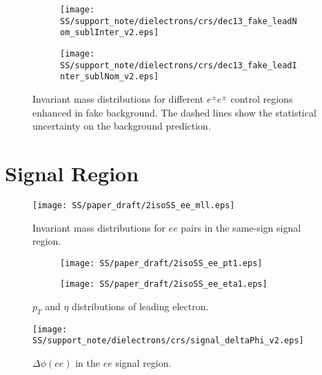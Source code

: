 \begin{figure}
\begin{subfigure}{.5\textwidth}
  \centering
  \texttt{[image: SS/support\_note/dielectrons/crs/dec13\_fake\_leadNom\_sublInter\_v2.eps]}
\end{subfigure}%
\begin{subfigure}{.5\textwidth}
  \centering
  \texttt{[image: SS/support\_note/dielectrons/crs/dec13\_fake\_leadInter\_sublNom\_v2.eps]}
\end{subfigure}
\caption{\toDo Invariant mass distributions for different $e^{\pm}e^{\pm}$ control regions enhanced in fake background. The dashed lines show the statistical uncertainty on the background prediction.}
  \label{fig:fakeCR_part2}
\end{figure}



\section{Signal Region}
\label{sec:ss_signalRegion}


\begin{figure}[h]
\begin{center}
\texttt{[image: SS/paper\_draft/2isoSS\_ee\_mll.eps]}
\caption{\toDo Invariant mass distributions for $ee$ pairs in the same-sign signal region.}
\label{fig:signal_mass}
\end{center}
\end{figure}


\begin{figure}
\begin{subfigure}{.5\textwidth}
  \centering
  \texttt{[image: SS/paper\_draft/2isoSS\_ee\_pt1.eps]}
\end{subfigure}%
\begin{subfigure}{.5\textwidth}
  \centering
  \texttt{[image: SS/paper\_draft/2isoSS\_ee\_eta1.eps]}
\end{subfigure}
\caption{\toDo $p_T$ and $\eta$ distributions of leading electron.}
  \label{fig:signal_kinematics}
\end{figure}

\begin{figure}[h]
\begin{center}
\texttt{[image: SS/support\_note/dielectrons/crs/signal\_deltaPhi\_v2.eps]}
\caption{\toDo $\Delta\phi(ee)$ in the $ee$ signal region.}
\label{fig:delta_phi}
\end{center}
\end{figure}



